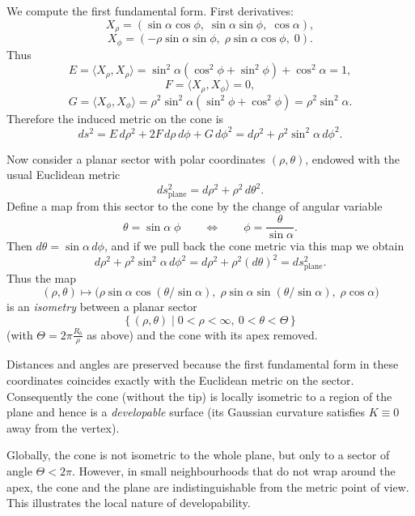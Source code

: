 \begin{solution}
	We compute the first fundamental form.  First derivatives:
	\[
	X_\rho = (\sin\alpha\cos\phi,\;\sin\alpha\sin\phi,\;\cos\alpha),
	\]
	\[
	X_\phi = (-\rho\sin\alpha\sin\phi,\;\rho\sin\alpha\cos\phi,\;0).
	\]
	Thus
	\[
	E = \langle X_\rho,X_\rho\rangle
	= \sin^2\alpha(\cos^2\phi+\sin^2\phi)+\cos^2\alpha = 1,
	\]
	\[
	F = \langle X_\rho,X_\phi\rangle = 0,
	\]
	\[
	G = \langle X_\phi,X_\phi\rangle
	= \rho^2\sin^2\alpha(\sin^2\phi+\cos^2\phi)
	= \rho^2\sin^2\alpha.
	\]
	Therefore the induced metric on the cone is
	\[
	ds^2 = E\,d\rho^2 + 2F\,d\rho\,d\phi + G\,d\phi^2
	= d\rho^2 + \rho^2\sin^2\alpha\,d\phi^2.
	\]
	
	Now consider a planar sector with polar coordinates $(\rho,\theta)$, endowed
	with the usual Euclidean metric
	\[
	ds^2_{\text{plane}} = d\rho^2 + \rho^2\,d\theta^2.
	\]
	Define a map from this sector to the cone by the change of angular variable
	\[
	\theta = \sin\alpha\;\phi
	\qquad\Longleftrightarrow\qquad
	\phi = \frac{\theta}{\sin\alpha}.
	\]
	Then $d\theta = \sin\alpha\,d\phi$, and if we pull back the cone metric via this
	map we obtain
	\[
	d\rho^2 + \rho^2\sin^2\alpha\,d\phi^2
	= d\rho^2 + \rho^2(d\theta)^2
	= ds^2_{\text{plane}}.
	\]
	Thus the map
	\[
	(\rho,\theta) \longmapsto
	\bigl(\rho\sin\alpha\cos(\theta/\sin\alpha),\;
	\rho\sin\alpha\sin(\theta/\sin\alpha),\;
	\rho\cos\alpha\bigr)
	\]
	is an \emph{isometry} between a planar sector
	\[
	\{\,(\rho,\theta)\mid 0<\rho<\infty,\ 0<\theta<\Theta\,\}
	\]
	(with $\Theta = 2\pi\frac{R_b}{\rho}$ as above) and the cone with its apex
	removed.
	
	Distances and angles are preserved because the first fundamental form in these
	coordinates coincides exactly with the Euclidean metric on the sector.
	Consequently the cone (without the tip) is locally isometric to a region of the
	plane and hence is a \emph{developable} surface (its Gaussian curvature
	satisfies $K\equiv0$ away from the vertex).
	
	\begin{remark}
		Globally, the cone is not isometric to the whole plane, but only to a sector of
		angle $\Theta<2\pi$.  However, in small neighbourhoods that do not wrap around
		the apex, the cone and the plane are indistinguishable from the metric point of
		view.  This illustrates the local nature of developability.
	\end{remark}
\end{solution}

